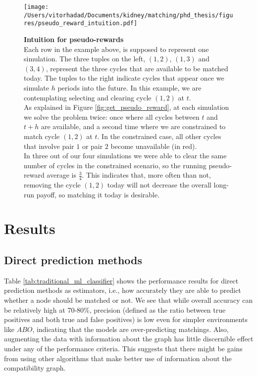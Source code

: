 \begin{landscape}
\vspace*{2cm}
\begin{figure}[h]
\centering
\texttt{[image: /Users/vitorhadad/Documents/kidney/matching/phd\_thesis/figures/pseudo\_reward\_intuition.pdf]}
\caption[Intuition for pseudo-rewards]{\textbf{Intuition for pseudo-rewards} \\
  Each row in the example above, is supposed to represent one simulation. The three tuples on the left, $(1,2)$, $(1,3)$ and $(3,4)$, represent the three cycles that are available to be matched today. The tuples to the right indicate cycles that appear once we simulate $h$ periods into the future. In this example, we are contemplating selecting and clearing cycle $(1,2)$ at $t$. \\
  As explained in Figure \ref{fig:get_pseudo_reward}, at each simulation we solve the problem twice: once where all cycles between $t$ and $t+h$ are available, and a second time where we are constrained to match cycle $(1,2)$ at $t$. In the constrained case, all other cycles that involve pair $1$ or pair $2$ become unavailable (in red). \\ 
  In three out of our four simulations we were able to clear the same number of cycles in the constrained scenario, so the running pseudo-reward average is $\frac{3}{4}$. This indicates that, more often than not, removing the cycle $(1,2)$ today will not decrease the overall long-run payoff, so matching it today is desirable.
}
\label{fig:pseudo_reward_intuition}
\end{figure}
\vspace*{\fill}
\end{landscape}



\section{Results}

\subsection{Direct prediction methods} 

Table \ref{tab:traditional_ml_classifier} shows the performance results for direct prediction methods as estimators, i.e., how accurately they are able to predict whether a node should be matched or not. We see that while overall accuracy can be relatively high at 70-80\%, precision (defined as the ratio between true positives and both true and false positives) is low even for simpler environments like $ABO$, indicating that the models are over-predicting matchings. Also, augmenting the data with information about the graph has little discernible effect under any of the performance criteria. This suggests that there might be gains from using other algorithms that make better use of information about the compatibility graph. 


